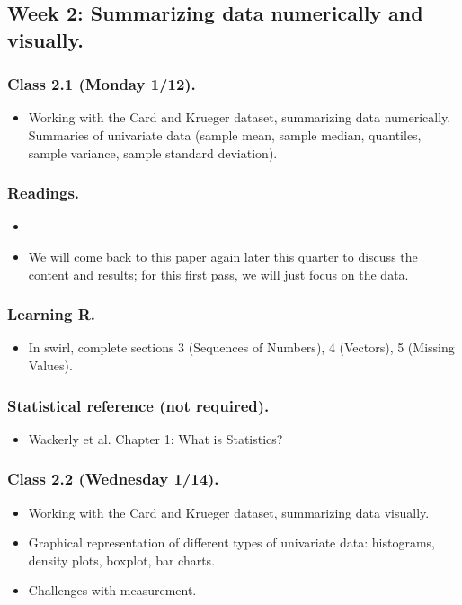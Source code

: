 \documentclass[letterpaper, 12pt, parskip=full,DIV=10]{scrartcl}
\begin{document}
\subsection*{Week 2: Summarizing data numerically and visually.}
\subsubsection*{Class 2.1 (Monday 1/12).}
\begin{itemize}
\item Working with the Card and Krueger dataset, summarizing data numerically.
Summaries of univariate data (sample mean, sample median, quantiles, sample variance, sample standard deviation).
\end{itemize}

\subsubsection*{Readings.}
\begin{itemize}
\item {}
\item We will come back to this paper again later this quarter to discuss the content and results; for this first pass, we will just focus on the data.
\end{itemize}

\subsubsection*{Learning R.}
\begin{itemize}
\item In swirl, complete sections 3 (Sequences of Numbers), 4 (Vectors), 5 (Missing Values).
\end{itemize}

\subsubsection*{Statistical reference (not required).}
\begin{itemize}
\item Wackerly et al. Chapter 1: What is Statistics?
\end{itemize}

\subsubsection*{Class 2.2 (Wednesday 1/14).}
\begin{itemize}
\item Working with the Card and Krueger dataset, summarizing data visually.
\item Graphical representation of different types of univariate data: histograms, density plots, boxplot, bar charts.
\item Challenges with measurement.
\end{itemize}
\end{document}

